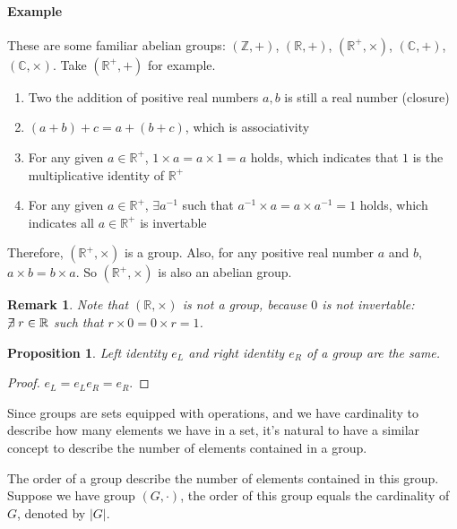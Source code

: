 \documentclass[UTF8]{ctexart}
\theoremstyle{mystyle}
\newtheorem{proposition}{Proposition}[section]
\theoremstyle{myremark}
\newtheorem*{remark}{Remark}
\theoremstyle{plain}
\newcommand{\R}{\mathbb R}
\newcommand{\Z}{\mathbb Z}
\newcommand{\C}{\mathbb C}
\begin{document}
\paragraph{Example}
These are some familiar abelian groups: $ (\Z, +) $, $ (\R, +) $, $ (\R^+, \times) $, $ (\C, +) $, $ (\C, \times) $. Take $ (\R^+, +) $ for example. 

\begin{enumerate}
    \item Two the addition of positive real numbers $ a, b $ is still a real number (closure)
    \item $ (a + b) + c = a + (b + c) $, which is associativity
    \item For any given $ a \in \R^+ $, $ 1 \times a = a \times 1 = a $ holds, which indicates that $ 1 $ is the multiplicative identity of $ \R^+ $
    \item For any given $ a \in \R^+ $, $ \exists a^{-1} $ such that $ a^{-1} \times a = a \times a^{-1} = 1 $ holds, which indicates all $ a \in \R^+ $ is invertable
\end{enumerate}

Therefore, $ (\R^+, \times) $ is a group. Also, for any positive real number $ a $ and $ b $, $ a \times b = b \times a $. So $ (\R^+, \times) $ is also an abelian group.


\begin{remark}
    Note that $ (\R, \times) $ is not a group, because $ 0 $ is not invertable: $ \centernot\exists r \in \R $ such that $ r \times 0 = 0 \times r = 1 $.
\end{remark}


\begin{proposition}
    Left identity $ e_L $ and right identity $ e_R $ of a group are the same.
\end{proposition}

\begin{proof}
    $ e_L = e_L e_R = e_R $.
\end{proof}

Since groups are sets equipped with operations, and we have cardinality to describe how many elements we have in a set, it's natural to have a similar concept to describe the number of elements contained in a group.

\begin{definition}
    The order of a group describe the number of elements contained in this group. Suppose we have group $ (G, \cdot) $, the order of this group equals the cardinality of $ G $, denoted by $ |G| $.
\end{definition}
\end{document}
